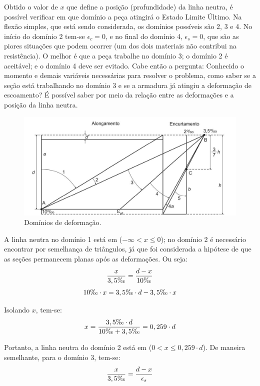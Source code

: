 Obtido o valor de $x$ que define a posição (profundidade) da linha neutra, é possível verificar em que domínio a peça atingirá o Estado Limite Último. Na flexão simples, que está sendo considerada, os domínios possíveis são 2, 3 e 4. No início do domínio 2 tem-se $\epsilon_c=0$, e no final do domínio 4, $\epsilon_s=0$, que são as piores situações que podem ocorrer (um dos dois materiais não contribui na resistência). O melhor é que a peça trabalhe no domínio 3; o domínio 2 é aceitável; e o domínio 4 deve ser evitado. Cabe então a pergunta: Conhecido o momento e demais variáveis necessárias para resolver o problema, como saber se a seção está trabalhando no domínio 3 e se a armadura já atingiu a deformação de escoamento? É possível saber por meio da relação entre as deformações e a posição da linha neutra.

\begin{figure}[H]
	\begin{center}
	\caption{Domínios de deformação.}
    	\includegraphics[width=\textwidth]{Dominios-de-deformacao/Imagens/Dominios-de-deformacao.jpg}
	\end{center}
\end{figure}

A linha neutra no domínio 1 está em ($-\infty<x\leqslant0$); no domínio 2 é necessário encontrar por semelhança de triângulos, já que foi considerada a hipótese de que as seções permanecem planas após as deformações. Ou seja:
$$\frac{x}{3,5\text{\textperthousand}}=\frac{d-x}{10\text{\textperthousand}}$$
$$10\text{\textperthousand}\cdot x=3,5\text{\textperthousand}\cdot d-3,5\text{\textperthousand}\cdot x$$

Isolando $x$, tem-se:
$$x=\frac{3,5\text{\textperthousand}\cdot d}{10\text{\textperthousand}+3,5\text{\textperthousand}}=0,259\cdot d$$

Portanto, a linha neutra do domínio 2 está em ($0<x\leqslant0,259\cdot d$). De maneira semelhante, para o domínio 3, tem-se:
\begin{equation}
	\label{equacao-dominio-3}
	\frac{x}{3,5\text{\textperthousand}}=\frac{d-x}{\epsilon_s}
\end{equation}

